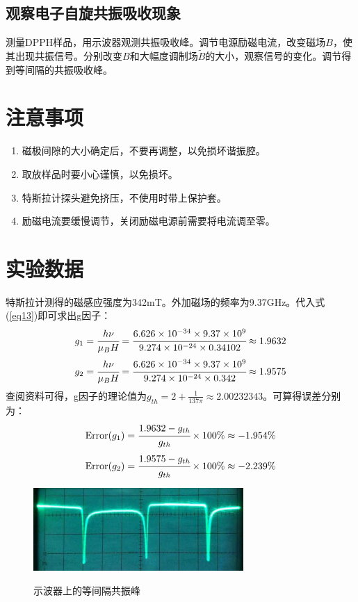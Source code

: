 \documentclass[a4paper]{article}
\begin{document}
\subsection{观察电子自旋共振吸收现象}
测量DPPH样品，用示波器观测共振吸收峰。调节电源励磁电流，改变磁场$ B $，使其出现共振信号。分别改变$ B $和大幅度调制场$\tilde{B}$的大小，观察信号的变化。调节得到等间隔的共振吸收峰。

\section{注意事项}
\begin{enumerate}
\item 磁极间隙的大小确定后，不要再调整，以免损坏谐振腔。
\item 取放样品时要小心谨慎，以免损坏。
\item 特斯拉计探头避免挤压，不使用时带上保护套。
\item 励磁电流要缓慢调节，关闭励磁电源前需要将电流调至零。
\end{enumerate}

\section{实验数据}
特斯拉计测得的磁感应强度为342mT。外加磁场的频率为9.37GHz。代入式(\ref{eq13})即可求出g因子：
\begin{equation}
g_1 = \cfrac{h\nu}{\mu_B H} = \cfrac{6.626\times 10^{-34}\times 9.37\times 10^{9}}{9.274\times 10^{-24}\times 0.34102} \approx 1.9632
\end{equation}
\begin{equation}
g_2 = \cfrac{h\nu}{\mu_B H} = \cfrac{6.626\times 10^{-34}\times 9.37\times 10^{9}}{9.274\times 10^{-24}\times 0.342} \approx 1.9575
\end{equation}
查阅资料可得，g因子的理论值为$g_{th}=2+\frac{1}{137\pi} \approx 2.00232343$。可算得误差分别为：
\begin{equation}
\text{Error}(g_1) = \cfrac{1.9632 - g_{th}}{g_{th}}\times 100\% \approx -1.954\%
\end{equation}
\begin{equation}
\text{Error}(g_2) = \cfrac{1.9575 - g_{th}}{g_{th}}\times 100\% \approx -2.239\%
\end{equation}
\begin{figure}[!h]
\centering
\includegraphics[width=8cm]{fig/datafig.jpg}\\
\caption{示波器上的等间隔共振峰}\label{datafig1}
\end{figure}
\end{document}
